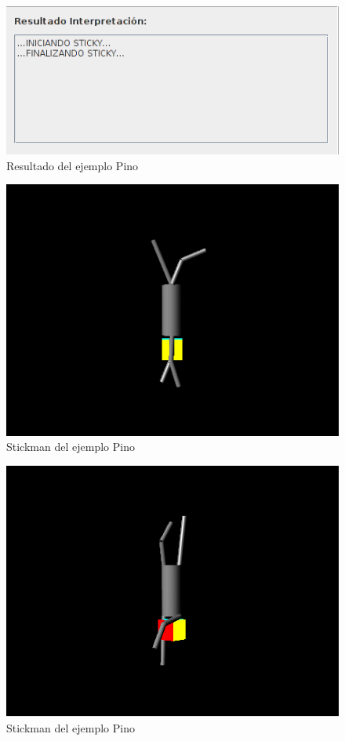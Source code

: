 \documentclass[a4paper, 12pt]{book}
\begin{document}
\begin{itemize}
\begin{figure}[htb]
  \centerline{\includegraphics[width=\textwidth]{./imagenes/pino1-resultado.png}}
  \caption{Resultado del ejemplo Pino}
\end{figure}

\begin{figure}[htb]
  \centerline{\includegraphics[width=\textwidth]{./imagenes/pino1-stickman.png}}
  \caption{Stickman del ejemplo Pino}
\end{figure}

\begin{figure}[htb]
  \centerline{\includegraphics[width=\textwidth]{./imagenes/pino2-stickman.png}}
  \caption{Stickman del ejemplo Pino}
\end{figure}


\end{itemize}
\end{document}
